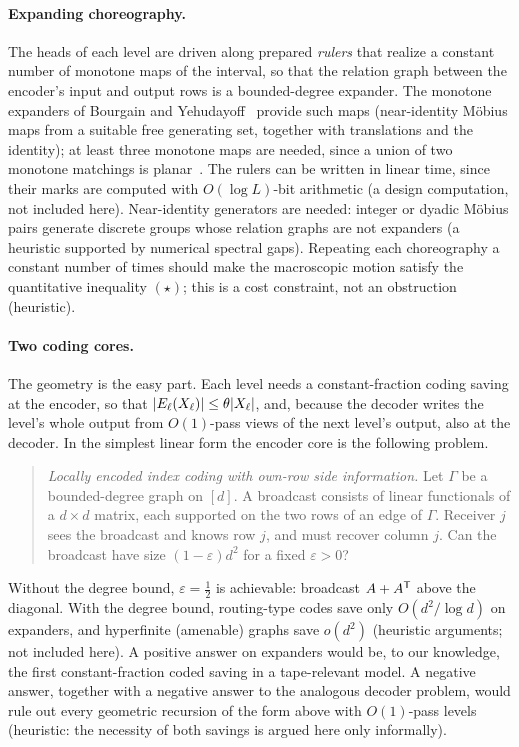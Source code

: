 \paragraph{Expanding choreography.} The heads of each level are driven along prepared \emph{rulers} that realize
a constant number of monotone maps of the interval, so that the relation graph between the encoder's input and
output rows is a bounded-degree expander. The monotone expanders of Bourgain and
Yehudayoff~\cite{BourgainYehudayoff2013} provide such maps (near-identity M\"obius maps from a suitable free
generating set, together with translations and the identity); at least three monotone maps are needed, since a union
of two monotone matchings is planar~\cite{DSW2016}. The rulers can be written in linear time, since their marks are
computed with $O(\log L)$-bit arithmetic (a design computation, not included here). Near-identity generators are needed: integer or dyadic M\"obius pairs generate
discrete groups whose relation graphs are not expanders (a heuristic supported by numerical spectral gaps).
Repeating each choreography a constant number of times should make the macroscopic motion satisfy the
quantitative inequality $(\star)$; this is a cost constraint, not an obstruction (heuristic).

\paragraph{Two coding cores.} The geometry is the easy part. Each level needs a constant-fraction coding saving at
the encoder, so that $\lvert E_\ell(X_\ell) \rvert\le\theta\lvert X_\ell \rvert$, and, because the decoder writes the level's whole
output from $O(1)$-pass views of the next level's output, also at the decoder. In the simplest linear form the
encoder core is the following problem.

\begin{quote}
\emph{Locally encoded index coding with own-row side information.} Let $\Gamma$ be a bounded-degree graph on
$[d]$. A broadcast consists of linear functionals of a $d\times d$ matrix, each supported on the two rows of an
edge of $\Gamma$. Receiver $j$ sees the broadcast and knows row $j$, and must recover column $j$. Can the broadcast
have size $(1-\varepsilon)d^2$ for a fixed $\varepsilon>0$?
\end{quote}

Without the degree bound, $\varepsilon=\tfrac12$ is achievable: broadcast $A+A^{\mathsf{T}}$ above the diagonal. With the
degree bound, routing-type codes save only $O(d^2/\log d)$ on expanders, and hyperfinite (amenable) graphs save
$o(d^2)$ (heuristic arguments; not included here). A positive answer on expanders would be, to our knowledge, the first
constant-fraction coded saving in a tape-relevant model. A negative answer, together with a negative answer to the
analogous decoder problem, would rule out every geometric recursion of the form above with $O(1)$-pass levels
(heuristic: the necessity of both savings is argued here only informally).

